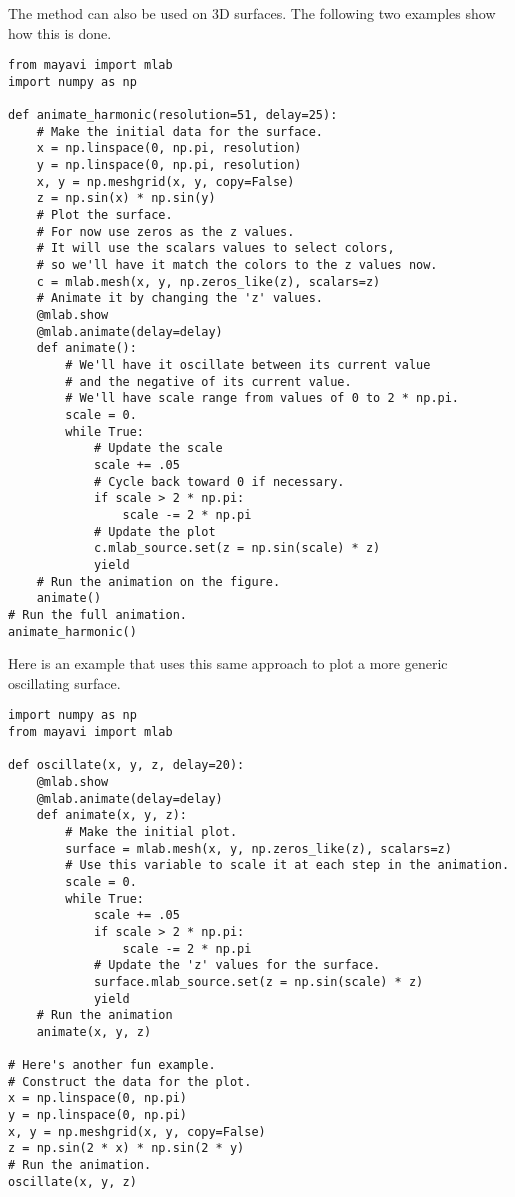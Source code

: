 The  method can also be used on 3D surfaces.
The following two examples show how this is done.
\begin{lstlisting}
from mayavi import mlab
import numpy as np

def animate_harmonic(resolution=51, delay=25):
    # Make the initial data for the surface.
    x = np.linspace(0, np.pi, resolution)
    y = np.linspace(0, np.pi, resolution)
    x, y = np.meshgrid(x, y, copy=False)
    z = np.sin(x) * np.sin(y)
    # Plot the surface.
    # For now use zeros as the z values.
    # It will use the scalars values to select colors,
    # so we'll have it match the colors to the z values now.
    c = mlab.mesh(x, y, np.zeros_like(z), scalars=z)
    # Animate it by changing the 'z' values.
    @mlab.show
    @mlab.animate(delay=delay)
    def animate():
        # We'll have it oscillate between its current value
        # and the negative of its current value.
        # We'll have scale range from values of 0 to 2 * np.pi.
        scale = 0.
        while True:
            # Update the scale
            scale += .05
            # Cycle back toward 0 if necessary.
            if scale > 2 * np.pi:
                scale -= 2 * np.pi
            # Update the plot
            c.mlab_source.set(z = np.sin(scale) * z)
            yield
    # Run the animation on the figure.
    animate()
# Run the full animation.
animate_harmonic()
\end{lstlisting}

Here is an example that uses this same approach to plot a more generic oscillating surface.
\begin{lstlisting}
import numpy as np
from mayavi import mlab

def oscillate(x, y, z, delay=20):
    @mlab.show
    @mlab.animate(delay=delay)
    def animate(x, y, z):
        # Make the initial plot.
        surface = mlab.mesh(x, y, np.zeros_like(z), scalars=z)
        # Use this variable to scale it at each step in the animation.
        scale = 0.
        while True:
            scale += .05
            if scale > 2 * np.pi:
                scale -= 2 * np.pi
            # Update the 'z' values for the surface.
            surface.mlab_source.set(z = np.sin(scale) * z)
            yield
    # Run the animation
    animate(x, y, z)

# Here's another fun example.
# Construct the data for the plot.
x = np.linspace(0, np.pi)
y = np.linspace(0, np.pi)
x, y = np.meshgrid(x, y, copy=False)
z = np.sin(2 * x) * np.sin(2 * y)
# Run the animation.
oscillate(x, y, z)
\end{lstlisting}